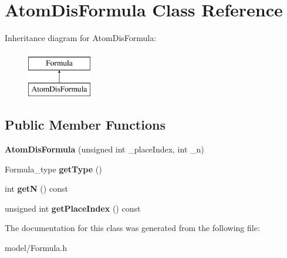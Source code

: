 \hypertarget{classAtomDisFormula}{\section{Atom\-Dis\-Formula Class Reference}
\label{classAtomDisFormula}
}
Inheritance diagram for Atom\-Dis\-Formula\-:\begin{figure}[H]
\begin{center}
\leavevmode
\includegraphics[height=2.000000cm]{classAtomDisFormula}
\end{center}
\end{figure}
\subsection*{Public Member Functions}
\begin{DoxyCompactItemize}
\item 
\hypertarget{classAtomDisFormula_ad9f872e92df52655d165ff9a01308331}{{\bfseries Atom\-Dis\-Formula} (unsigned int \-\_\-place\-Index, int \-\_\-n)}\label{classAtomDisFormula_ad9f872e92df52655d165ff9a01308331}

\item 
\hypertarget{classAtomDisFormula_ad0170c8eb8d835a2a5a5544b27bf5e6a}{Formula\-\_\-type {\bfseries get\-Type} ()}\label{classAtomDisFormula_ad0170c8eb8d835a2a5a5544b27bf5e6a}

\item 
\hypertarget{classAtomDisFormula_aa2e45ee43ca473e5388f4cff731b0e44}{int {\bfseries get\-N} () const }\label{classAtomDisFormula_aa2e45ee43ca473e5388f4cff731b0e44}

\item 
\hypertarget{classAtomDisFormula_af7fc615a88b6c197a59e873a62cc7d61}{unsigned int {\bfseries get\-Place\-Index} () const }\label{classAtomDisFormula_af7fc615a88b6c197a59e873a62cc7d61}

\end{DoxyCompactItemize}


The documentation for this class was generated from the following file\-:\begin{DoxyCompactItemize}
\item 
model/Formula.\-h\end{DoxyCompactItemize}

